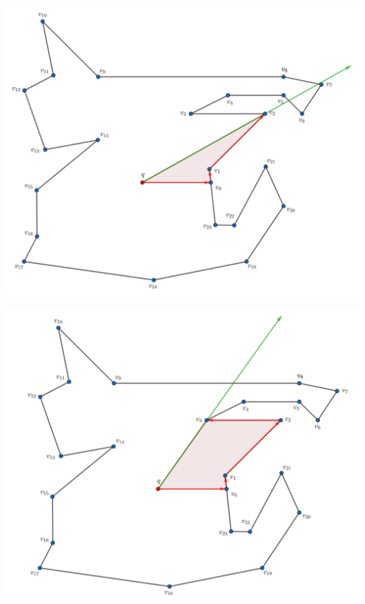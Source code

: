 \begin{frame}
  \centering \includegraphics[width=0.70 \paperwidth]{images/Ejecucion/e04.png}
\end{frame}

\begin{frame}
  \centering \includegraphics[width=0.70 \paperwidth]{images/Ejecucion/e05.png}
\end{frame}

